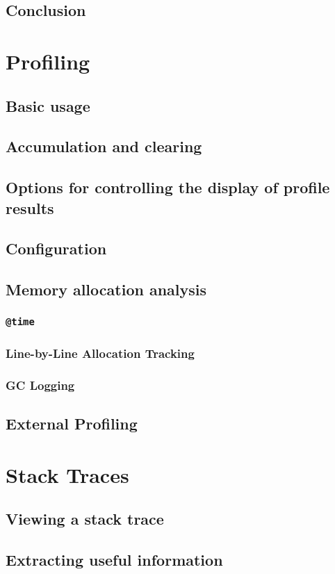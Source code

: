     \section{Conclusion}
  \chapter{Profiling}
    \section{Basic usage}
    \section{Accumulation and clearing}
    \section{Options for controlling the display of profile results}
    \section{Configuration}
    \section{Memory allocation analysis}
    \subsection{\texttt{@time}}
    \subsection{Line-by-Line Allocation Tracking}
    \subsection{GC Logging}
    \section{External Profiling}
  \chapter{Stack Traces}
    \section{Viewing a stack trace}
    \section{Extracting useful information}
